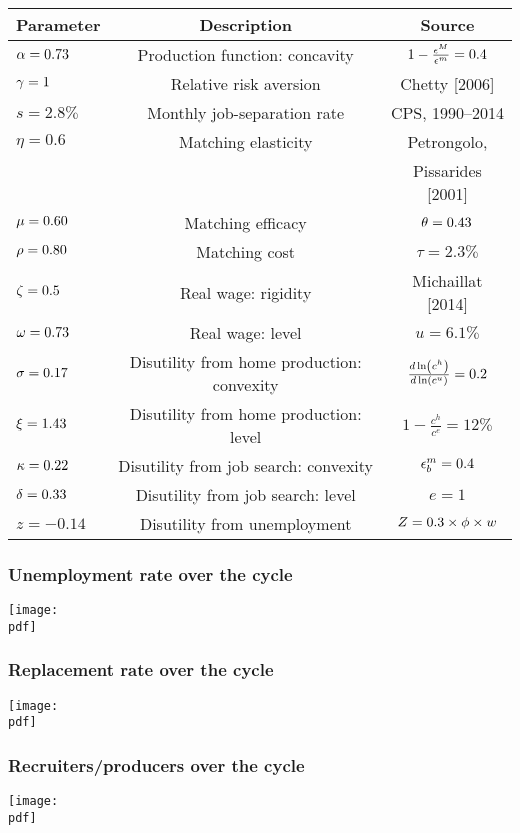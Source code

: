 \documentclass[12pt,xcolor={dvipsnames},hyperref={pdftex,pdfpagemode=UseNone,hidelinks,pdfdisplaydoctitle=true},usepdftitle=false]{beamer}
\def\pdf{xui.pdf}
\begin{document}
\begin{frame}
\begin{table}
\footnotesize\begin{tabular*}{\textwidth}{@{\extracolsep\fill}lcc}
Parameter & Description  & Source\\
\toprule
$\alpha=0.73$ & Production function: concavity & $1-\frac{\epsilon^{M}}{\epsilon^{m}}=0.4$\\
$\gamma = 1$ & Relative risk aversion & Chetty [2006] \\
$s = 2.8\%$ & Monthly job-separation rate & CPS, 1990--2014 \\
$\eta=0.6$ & Matching elasticity  & Petrongolo,\\
& & Pissarides [2001]\\
$\mu=0.60$ & Matching efficacy & $\theta=0.43$\\
$\rho=0.80$ & Matching cost & $\tau=2.3\%$\\
$\zeta=0.5$ & Real wage: rigidity & Michaillat [2014] \\
$\omega=0.73$ & Real wage: level & $u=6.1\%$\\
$\sigma=0.17$ & Disutility from home production: convexity & $\odl{c^{h}}{c^{u}}=0.2$\\
$\xi=1.43$ & Disutility from home production: level &  $1-\frac{c^{h}}{c^{e}}=12\%$\\
$\kappa=0.22$ & Disutility from job search: convexity & $\epsilon^{m}_{b}=0.4$\\
$\delta=0.33$ & Disutility from job search: level &  $e=1$\\
$z=-0.14$ & Disutility from unemployment &  $Z=0.3 \times \phi \times w$\\
\bottomrule\end{tabular*}
\end{table}   
\end{frame}

\begin{frame}
\frametitle{Unemployment rate over the cycle}
\texttt{[image: \\pdf]}%
\end{frame}

\begin{frame}
\frametitle{Replacement rate over the cycle}
\texttt{[image: \\pdf]}%
\end{frame}


\begin{frame}
\frametitle{Recruiters/producers over the cycle}
\texttt{[image: \\pdf]}%
\end{frame}
\end{document}
